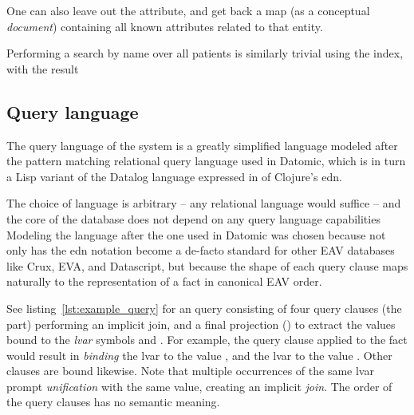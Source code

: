 \begin{center}
\end{center}

One can also leave out the attribute, and get back a map (as a conceptual \emph{document}) containing all known attributes related to that entity.

\begin{center}
\end{center}

Performing a search by name over all patients is similarly trivial using the  index, with the result

\begin{center}
\end{center}


\cleardoublepage
\subsection{Query language}\label{sec:query_language}

The query language of the system is a greatly simplified language modeled after the pattern matching relational query language used in Datomic, which is in turn a Lisp variant of the Datalog \cite{abiteboul1988datalog} language expressed in of Clojure's \gls{edn}.

The choice of language is arbitrary -- any relational language would suffice -- and the core of the database does not depend on any query language capabilities Modeling the language after the one used in Datomic was chosen because not only has the edn notation become a de-facto standard for other EAV databases like Crux, EVA, and Datascript, but because the shape of each query clause maps naturally to the representation of a fact in canonical EAV order.

See listing~\ref{lst:example_query} for an query consisting of four query clauses (the  part) performing an implicit join, and a final projection () to extract the values bound to the \emph{\gls{lvar}} symbols  and . For example, the query clause  applied to the fact  would result in \emph{binding} the lvar  to the value , and the lvar  to the value . Other clauses are bound likewise. Note that multiple occurrences of the same lvar prompt \emph{unification} with the same value, creating an implicit \emph{join}. The order of the query clauses has no semantic meaning.

